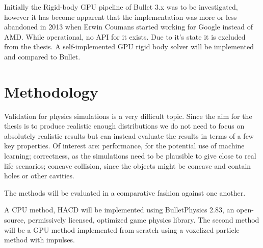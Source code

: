 Initially the Rigid-body GPU pipeline of Bullet 3.x was to be investigated, however
it has become apparent that the implementation was more or less abandoned in 2013
when Erwin Coumans started working for Google instead of AMD. While operational,
no API for it exists. Due to it's state it is excluded from the thesis.
A self-implemented GPU rigid body solver will be implemented and compared to Bullet.

\section{Methodology}
Validation for physics simulations is a very difficult topic. Since the aim for
the thesis is to produce realistic enough distributions we do not need to focus
on absolutely realistic results but can instead evaluate the results in terms of
a few key properties. Of interest are: performance, for the potential use of machine learning; correctness,
as the simulations need to be plausible to give close to real life scenarios; concave collision, since the objects might
 be concave and contain holes or other cavities.

The methods will be evaluated in a comparative fashion against one another.

A CPU method, HACD will be implemented using
BulletPhysics 2.83, an open-source, permissively licensed, optimized game physics
library. The second method will be a GPU method implemented from scratch using a
voxelized particle method with impulses.
